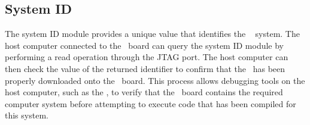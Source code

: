 \subsection{System ID}

The system ID module provides a unique value that identifies the \systemName~
system.  The host computer connected to the \DEBoard~board can query the
system ID module by performing a read operation through the JTAG port. The host computer can 
then check the value of the returned identifier to confirm that the \systemName~has 
been properly downloaded onto the \DEBoard~board.  This process allows debugging tools on the 
host computer, such as the \productNameMed{}, to verify that the 
\DEBoard~board contains the required computer system before attempting to execute code 
that has been compiled for this system.
